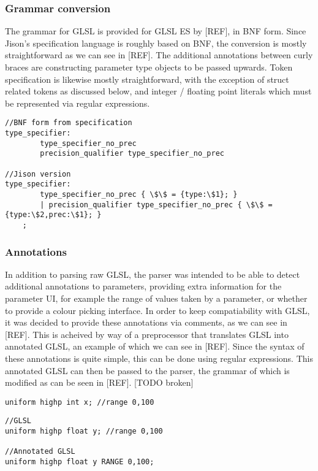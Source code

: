 \documentclass[12pt,twoside,notitlepage]{report}
\begin{document}
\subsubsection{Grammar conversion}
The grammar for GLSL is provided for GLSL ES by [REF], in BNF form. Since Jison's specification language is roughly based on BNF, the conversion is mostly straightforward as we can see in [REF]. The additional annotations between curly braces are constructing parameter type objects to be passed upwards. Token specification is likewise mostly straightforward, with the exception of struct related tokens as discussed below, and integer / floating point literals which must be represented via regular expressions.

\begin{verbatim}
//BNF form from specification
type_specifier:
        type_specifier_no_prec
        precision_qualifier type_specifier_no_prec

//Jison version
type_specifier:
        type_specifier_no_prec { \$\$ = {type:\$1}; }
        | precision_qualifier type_specifier_no_prec { \$\$ = {type:\$2,prec:\$1}; }
	;
\end{verbatim}

\subsubsection{Annotations}
In addition to parsing raw GLSL, the parser was intended to be able to detect additional annotations to parameters, providing extra information for the parameter UI, for example the range of values taken by a parameter, or whether to provide a colour picking interface. In order to keep compatiability with GLSL, it was decided to provide these annotations via comments, as we can see in [REF]. This is acheived by way of a preprocessor that translates GLSL into annotated GLSL, an example of which we can see in [REF]. Since the syntax of these annotations is quite simple, this can be done using regular expressions. This annotated GLSL can then be passed to the parser, the grammar of which is modified as can be seen in [REF]. [TODO broken]

\begin{verbatim}
uniform highp int x; //range 0,100
\end{verbatim}

\begin{verbatim}
//GLSL
uniform highp float y; //range 0,100

//Annotated GLSL
uniform highp float y RANGE 0,100;
\end{verbatim}
\end{document}
